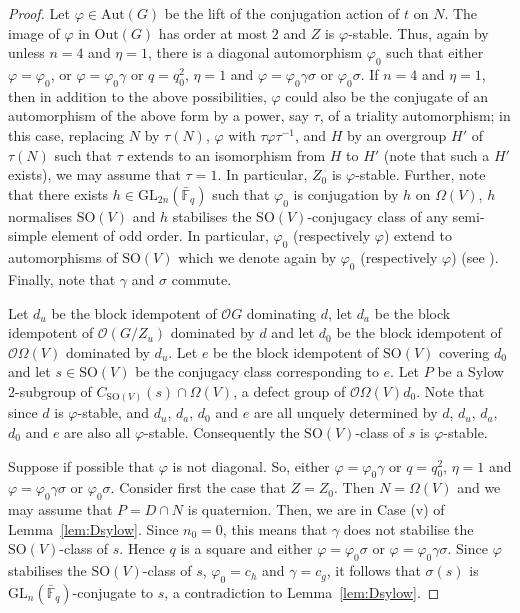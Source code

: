 \documentclass{amsart}
\theoremstyle{plain}\newtheorem{Theorem}{Theorem}[section]
\theoremstyle{plain}\newtheorem{Conjecture}[Theorem]{Conjecture}
\theoremstyle{plain}\newtheorem{Corollary}[Theorem]{Corollary}
\theoremstyle{plain}\newtheorem{Lemma}[Theorem]{Lemma}
\theoremstyle{plain}\newtheorem{Proposition}[Theorem]{Proposition}
\theoremstyle{definition}\newtheorem{Definition}[Theorem]{Definition}
\theoremstyle{definition}\newtheorem{Example}[Theorem]{Example}
\theoremstyle{definition}\newtheorem{Examples}[Theorem]{Examples}
\theoremstyle{definition}\newtheorem{Exercise}[Theorem]{Exercise}
\theoremstyle{definition}\newtheorem{Notation}[Theorem]{Notation}
\theoremstyle{definition}\newtheorem{Remark}[Theorem]{Remark}
\theoremstyle{definition}\newtheorem{Remarks}[Theorem]{Remarks}
\def\CO{{\mathcal{O}}}    \def\OPE{{\mathcal{O}(P\rtimes E)}}
\def\Aut{\mathrm{Aut}}               \def\tenk{\otimes_k}
\def\GL{\mathrm{GL}}
\def\SO{\mathrm{SO}}
\def\Out{\mathrm{Out}}
\numberwithin{equation}{section}
\begin{document}
\begin{proof}
Let  $\varphi \in \Aut(G)$ be the lift of  the conjugation action of  $t$ on $N$.  
The image of  $\varphi $ in $\Out (G) $   has  order at most  $2$  and $ Z$  is $\varphi$-stable.  Thus, again by \cite[Thms.~2.5.12,~2.5.14]{GLS3} unless $n=4 $ and  $\eta=1 $, there is a diagonal automorphism  $\varphi_0$  such that  either $\varphi=  \varphi_0 $, or   $\varphi =  \varphi_0 \gamma  $ or $q =q_0^2 $,  $\eta  =1 $ and $\varphi=   \varphi_0 \gamma  \sigma $  or $\varphi_0 \sigma $. If $n=4 $ and  $\eta=1 $, then in addition to the above possibilities,   $\varphi$ could also be  the  conjugate of  an automorphism of the above form  by   a power, say  $\tau $,  of  a  triality  automorphism;  in this case, replacing  $N$ by  $\tau (N)$, $\varphi $ with $\tau \varphi \tau^{-1}$,  and $H$  by an overgroup  $H'$   of $\tau(N)$   such that  $\tau $  extends to an isomorphism  from $H$ to $H'$ (note that such a $H'$ exists), we  may assume that  $\tau=1$. In particular, 
 $Z_0$  is $\varphi$-stable.
Further, note that  there exists  $h \in \GL_{2n} (\bar{\mathbb F}_q) $    such that  $\varphi_0  $   is conjugation by $h$  on $\Omega (V) $,  $h$ normalises  $\SO(V)  $   and  $h$ stabilises  the   $\SO(V)$-conjugacy class of   any semi-simple element of odd order. In particular, $\varphi_0 $  (respectively $\varphi $)  extend to automorphisms  of $\SO(V) $   which we denote again by  $\varphi_0$  (respectively $\varphi$) (see \cite[Thm.~2.5.14]{GLS3}). Finally, note that $\gamma $ and $\sigma $  commute.



Let $d_u$  be the  block idempotent of $\CO G$ dominating  $d$, let $ d_a $  be the  block idempotent of  $\CO(G/Z_u) $  dominated by $d$  and let   $d_0$ be the block idempotent of $\CO \Omega (V)  $  dominated by $d_u$. Let  $e$  be the block  idempotent of  $\SO(V)$   covering $d_0$  and let   $s \in \SO(V)$  be the  conjugacy   class corresponding to $e$. Let   $P$   be  a Sylow $2$-subgroup of $C_{\SO(V) } (s)\cap  \Omega (V)$,  a defect group of $\CO \Omega (V)  d_0$. Note that  since $d$ is $\varphi$-stable, and  $d_u$, $d_a $,  $d_0$ and $e$  are all unquely determined by $d$, $d_u$, $d_a $,  $d_0$ and $e$  are  also all $\varphi$-stable.  Consequently  the  $\SO(V)$-class of $s$ is  $\varphi$-stable. 

Suppose  if possible that    $\varphi $ is not diagonal.  So, either  $\varphi =  \varphi_0 \gamma  $ or $q =q_0^2 $,  $\eta  =1 $ and $\varphi=   \varphi_0 \gamma  \sigma $  or $\varphi_0 \sigma $.   Consider first the case  that   $Z =Z_0 $. Then   $N=  \Omega (V)$    and  we may assume that  $P= D\cap N  $ is quaternion.   Then, we 
 are  in Case (v) of Lemma~\ref{lem:Dsylow}. Since $n_0=0 $, this means  that  $\gamma $  does not stabilise   the $\SO(V)$-class of $s$.  Hence   $q$  is a  square  and either  $\varphi=   \varphi_0  \sigma  $  or  $\varphi=   \varphi_0\gamma\sigma  $.   Since $\varphi $  stabilises  the $\SO(V)$-class of $s$, $\varphi_0= c_h $ and $\gamma =c_g $, it follows that  $\sigma  (s)  $ is  $\GL_n(\bar {\mathbb F}_q) $-conjugate  to $s$,  a  contradiction to  Lemma~\ref{lem:Dsylow}.
 

\end{proof}
\end{document}
